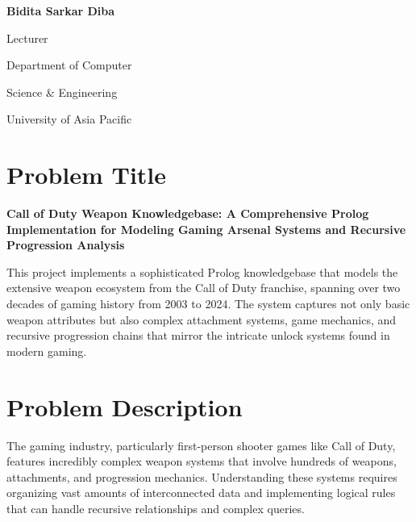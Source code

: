 \documentclass[12pt,a4paper]{article}
\begin{document}
\begin{titlepage}
\begin{minipage}[t]{0.45\textwidth}
        \vspace{0.5cm}

        {\large\bfseries Bidita Sarkar Diba}

        \vspace{0.3cm}

        {\large Lecturer}

        \vspace{0.3cm}

        {\large Department of Computer}

        \vspace{0.3cm}

        {\large Science \& Engineering}

        \vspace{0.3cm}

        {\large University of Asia Pacific}
    \end{minipage}

    \vfill

\end{titlepage}

\tableofcontents
\newpage

\section{Problem Title}

\textbf{Call of Duty Weapon Knowledgebase: A Comprehensive Prolog Implementation for Modeling Gaming Arsenal Systems and Recursive Progression Analysis}

This project implements a sophisticated Prolog knowledgebase that models the
extensive weapon ecosystem from the Call of Duty franchise, spanning over two
decades of gaming history from 2003 to 2024. The system captures not only basic
weapon attributes but also complex attachment systems, game mechanics, and
recursive progression chains that mirror the intricate unlock systems found in
modern gaming.

\section{Problem Description}

The gaming industry, particularly first-person shooter games like Call of Duty,
features incredibly complex weapon systems that involve hundreds of weapons,
attachments, and progression mechanics. Understanding these systems requires
organizing vast amounts of interconnected data and implementing logical rules
that can handle recursive relationships and complex queries.
\end{document}
